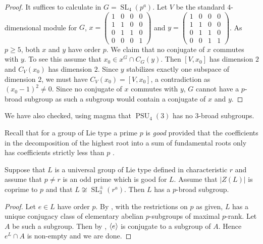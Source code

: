 \documentclass[12pt,a4paper]{amsart}
\DeclareMathOperator{\PSU}{PSU}
\DeclareMathOperator{\SL}{SL}
\DeclarePairedDelimiter{\gen}{\langle}{\rangle}
\begin{document}
\begin{proof}
It suffices to calculate in $G=\SL_4(p^a)$. Let $V$ be the standard $4$-dimensional module for $G$,  $x= \left(\begin{smallmatrix} 1&0&0&0\\1&1&0&0\\0&1&1&0\\0&0&0&1\end{smallmatrix}\right)$
and
$y= \left(\begin{smallmatrix} 1&0&0&0\\1&1&0&0\\0&1&1&0\\0&0&1&1\end{smallmatrix}\right)$.
As $p \ge 5$, both $x$ and $y$ have order $p$. We claim that no conjugate of $x$ commutes with $y$. To see this assume that $x_0 \in x^G\cap C_G(y)$.  Then $[V,x_0]$ has dimension $2$ and $C_V(x_0)$ has dimension $2$. Since $y$ stabilizes  exactly one subspace of dimension $2$, we must have $C_V(x_0)=[V,x_0]$, a contradiction as $(x_0-1)^2 \ne 0$. Since no conjugate of $x$ commutes with $y$, $G$ cannot have a  $p$-broad subgroup as such a subgroup would contain a conjugate of $x$ and $y$.
\end{proof}

We have also checked, using {\sc magma} that $\PSU_4(3)$ has no $3$-broad subgroups.

Recall that for   a    group of Lie type a prime $p$ is   \emph{good}   provided   that   the coefficients in the decomposition of the highest root into a sum of fundamental roots only has coefficients strictly less than $p$ \cite[Theorem 4.10.3 (e)]{GLS3}.

\begin{lemma}\label{lem:p-good}
Suppose that $L$ is a universal group of Lie type defined in characteristic $r$ and assume that $p\ne r$ is an odd prime which is good for $L$. Assume that $|Z(L)|$ is coprime to $p$ and that $L\not\cong \SL_3^\pm(r^a)$. Then $L$ has a $p$-broad subgroup.
\end{lemma}



\begin{proof}Let $e \in L$ have order $p$. By \cite[Theorem 4.10.3(c)]{GLS3}, with the restrictions on $p$ as given, $L$ has a unique conjugacy class of   elementary abelian $p$-subgroups of maximal $p$-rank. Let  $A$ be such a subgroup.
Then     by \cite[Theorem 4.10.3(e)]{GLS3}, $\gen{e}$ is conjugate to a subgroup of $A$. Hence $e^L \cap A$ is non-empty and we are done.
\end{proof}
\end{document}
